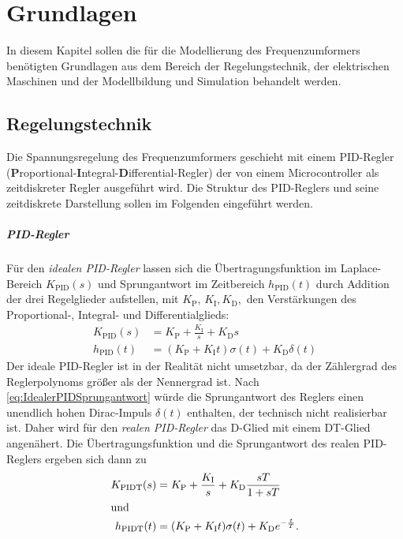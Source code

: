 \chapter{Grundlagen}
\label{chap:Grundlagen}
In diesem Kapitel sollen die für die Modellierung des Frequenzumformers benötigten Grundlagen aus dem Bereich der Regelungstechnik, der elektrischen Maschinen und der Modellbildung und Simulation  behandelt werden. 

\section{Regelungstechnik}
\label{sec:GrundlagenRegelungstechnik}
Die Spannungsregelung des Frequenzumformers geschieht mit einem PID-Regler (\textbf{P}ro\-por\-ti\-o\-nal-\textbf{I}ntegral-\textbf{D}ifferential-Regler) der von einem Microcontroller als zeitdiskreter Regler ausgeführt wird. Die Struktur des PID-Reglers und seine zeitdiskrete Darstellung sollen im Folgenden eingeführt werden.

\paragraph{PID-Regler}
\label{par:PID-Regler}
Für den \emph{idealen PID-Regler} lassen sich die Übertragungsfunktion im Laplace-Bereich $K_{\mathrm{PID}}(s)$ und Sprungantwort im Zeitbereich $h_{\mathrm{PID}}(t)$ durch Addition der drei Regelglieder aufstellen, mit $K_{\mathrm{P}},\,K_{\mathrm{I}},K_{\mathrm{D}},$ den Verstärkungen des Proportional-, Integral- und Differentialglieds:
\begin{align}
    K_{\mathrm{PID}}(s) &= K_{\mathrm{P}} + \frac{K_{\mathrm{I}}}{s} + K_{\mathrm{D}}s \label{eq:IdealerPID} \\
    h_{\mathrm{PID}}(t) &= (K_{\mathrm{P}} + K_{\mathrm{I}}t)\sigma(t) + K_{\mathrm{D}}\delta(t) \label{eq:IdealerPIDSprungantwort}
\end{align}
Der ideale PID-Regler ist in der Realität nicht umsetzbar, da der Zählergrad des Reglerpolynoms größer als der Nennergrad ist. Nach \cref{eq:IdealerPIDSprungantwort} würde die Sprungantwort des Reglers einen unendlich hohen Dirac-Impuls $\delta(t)$ enthalten, der technisch nicht realisierbar ist. Daher wird für den \emph{realen PID-Regler} das D-Glied mit einem DT-Glied angenähert. Die Übertragungsfunktion und die Sprungantwort des realen PID-Reglers ergeben sich dann zu\begin{align}
    K_{\mathrm{PIDT}}(s) &= K_{\mathrm{P}} + \frac{K_{\mathrm{I}}}{s} + K_{\mathrm{D}}\frac{sT}{1+sT} \label{eq:realerPID} \\
    \intertext{und}
    h_{\mathrm{PIDT}}(t) &= (K_{\mathrm{P}} + K_{\mathrm{I}}t)\sigma(t) + K_{\mathrm{D}} e^{-\frac t T}.
\end{align}
